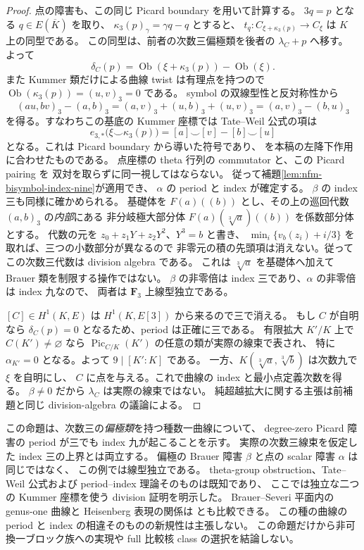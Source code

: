 \begin{proof}
点の障害も、この同じ Picard boundary を用いて計算する。
$3q=p$ となる $q\in E(\overline K)$ を取り、
$\kappa_3(p)_\gamma=\gamma q-q$ とすると、
$t_q:C_{\xi+\kappa_3(p)}\to C_\xi$ は $K$ 上の同型である。
この同型は、前者の次数三偏極類を後者の $\lambda_C+p$ へ移す。
よって
\[
 \delta_C(p)
   =\operatorname{Ob}(\xi+\kappa_3(p))-\operatorname{Ob}(\xi).
\]
また Kummer 類だけによる曲線 twist は有理点を持つので
$\operatorname{Ob}(\kappa_3(p))=(u,v)_3=0$ である。
symbol の双線型性と反対称性から
\[
 (au,bv)_3-(a,b)_3
  =(a,v)_3+(u,b)_3+(u,v)_3
  =(a,v)_3-(b,u)_3
\]
を得る。すなわちこの基底の Kummer 座標では Tate--Weil 公式の項は
\[
 e_{3,*}\bigl(\xi\smile\kappa_3(p)\bigr)
       =[a]\smile[v]-[b]\smile[u]
\]
となる。これは Picard boundary から導いた符号であり、
\cite[Theorem~3.7]{NFMCiperianiKrashen}を本稿の左降下作用に合わせたものである。
点座標の theta 行列の commutator と、この Picard pairing を
双対を取らずに同一視してはならない。
従って補題\ref{lem:nfm-bisymbol-index-nine}が適用でき、
$\alpha$ の period と index が確定する。
$\beta$ の index 三も同様に確かめられる。
基礎体を $F(a)((b))$ とし、その上の巡回代数 $(a,b)_3$ の\emph{内部}にある
非分岐極大部分体 $F(a)(\sqrt[3]{a})((b))$ を係数部分体とする。
代数の元を $z_0+z_1Y+z_2Y^2$、$Y^3=b$ と書き、
$\min_i\{v_b(z_i)+i/3\}$ を取れば、三つの小数部分が異なるので
非零元の積の先頭項は消えない。従ってこの次数三代数は division algebra である。
これは $\sqrt[3]{a}$ を基礎体へ加えて Brauer 類を制限する操作ではない。
$\beta$ の非零倍は index 三であり、$\alpha$ の非零倍は index 九なので、
両者は $\mathbf F_3$ 上線型独立である。

$[C]\in H^1(K,E)$ は $H^1(K,E[3])$ から来るので三で消える。
もし $C$ が自明なら $\delta_C(p)=0$ となるため、period は正確に三である。
有限拡大 $K'/K$ 上で $C(K')\ne\varnothing$ なら
$\operatorname{Pic}_{C/K}(K')$ の任意の類が実際の線束で表され、
特に $\alpha_{K'}=0$ となる。よって $9\mid[K':K]$ である。
一方、$K(\sqrt[3]{a},\sqrt[3]{b})$ は次数九で $\xi$ を自明にし、
$C$ に点を与える。これで曲線の index と最小点定義次数を得る。
$\beta\ne0$ だから $\lambda_C$ は実際の線束ではない。
純超越拡大に関する主張は前補題と同じ division-algebra の議論による。
\end{proof}

\begin{remark}[この曲線例の範囲]
この命題は、次数三の\emph{偏極類}を持つ種数一曲線について、
degree-zero Picard 障害の period が三でも index 九が起こることを示す。
実際の次数三線束を仮定した index 三の上界とは両立する。
偏極の Brauer 障害 $\beta$ と点の scalar 障害 $\alpha$ は同じではなく、
この例では線型独立である。
theta-group obstruction、Tate--Weil 公式および period--index 理論そのものは既知であり、
ここでは独立な二つの Kummer 座標を使う division 証明を明示した。
Brauer--Severi 平面内の genus-one 曲線と Heisenberg 表現の関係は
\cite[Sections~3--4, Theorem~5]{NFMSaltmanSeveri}とも比較できる。
この種の曲線の period と index の相違そのものの新規性は主張しない。
この命題だけから非可換一ブロック族への実現や full 比較核 class の選択を結論しない。
\end{remark}


